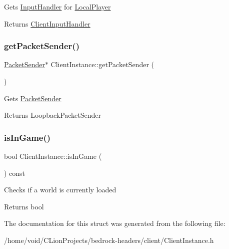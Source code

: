 Gets \mbox{\hyperlink{struct_input_handler}{Input\+Handler}} for \mbox{\hyperlink{class_local_player}{Local\+Player}} \begin{DoxyReturn}{Returns}
\mbox{\hyperlink{struct_client_input_handler}{Client\+Input\+Handler}} 
\end{DoxyReturn}
\mbox{\label{struct_client_instance_aad3a481a0988c04c3fade2b7f7e401b0}} 
\subsubsection{\texorpdfstring{getPacketSender()}{getPacketSender()}}
{\footnotesize\ttfamily \mbox{\hyperlink{struct_packet_sender}{Packet\+Sender}}$\ast$ Client\+Instance\+::get\+Packet\+Sender (\begin{DoxyParamCaption}{ }\end{DoxyParamCaption})}

Gets \mbox{\hyperlink{struct_packet_sender}{Packet\+Sender}} \begin{DoxyReturn}{Returns}
Loopback\+Packet\+Sender 
\end{DoxyReturn}
\mbox{\label{struct_client_instance_ad2672f5b5b1b5e7ee5eda83e527cd753}} 
\subsubsection{\texorpdfstring{isInGame()}{isInGame()}}
{\footnotesize\ttfamily bool Client\+Instance\+::is\+In\+Game (\begin{DoxyParamCaption}{ }\end{DoxyParamCaption}) const}

Checks if a world is currently loaded \begin{DoxyReturn}{Returns}
bool 
\end{DoxyReturn}


The documentation for this struct was generated from the following file\+:\begin{DoxyCompactItemize}
\item 
/home/void/\+C\+Lion\+Projects/bedrock-\/headers/client/Client\+Instance.\+h\end{DoxyCompactItemize}
